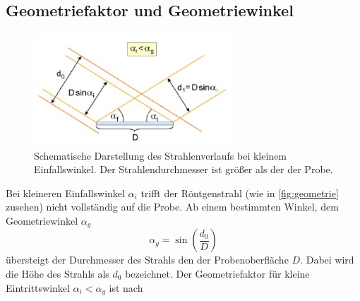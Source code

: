 \subsection{Geometriefaktor und Geometriewinkel}
\begin{figure}
    \caption{Schematische Darstellung des Strahlenverlaufs bei kleinem Einfallswinkel. Der Strahlendurchmesser ist größer als der der Probe.\cite[9]{anleitung}}\label{fig:geometrie}
    \includegraphics[width=7.5cm]{content/data/geometriefaktor.jpg}
\end{figure} 
Bei kleineren Einfallswinkel $\alpha_i$ trifft der Röntgenstrahl (wie in \autoref{fig:geometrie} zusehen) nicht vollständig auf die Probe.
Ab einem bestimmten Winkel, dem Geometriewinkel $\alpha_g$
\begin{equation}
    \alpha_g = \sin \left ( \frac{d_0}{D} \right )
    \label{eq:geometriewinkel}
\end{equation}
übersteigt der Durchmesser des Strahls den der Probenoberfläche $D$.
Dabei wird die Höhe des Strahls als $d_0$ bezeichnet.
Der Geometriefaktor für kleine Eintrittswinkel $\alpha_i < \alpha_g$ ist nach
